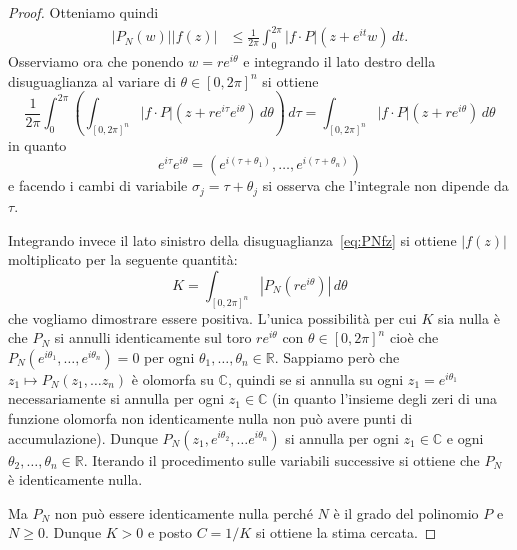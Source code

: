 \documentclass[italian,a4paper,oneside,headinclude]{scrbook}
\newcommand{\CC}{\mathbb C}
\newcommand{\RR}{\mathbb R}
\newcommand{\abs}[1]{{\left|#1\right|}}
\begin{document}
\begin{proof}
  Otteniamo quindi
  \begin{equation}\label{eq:PNfz}
  \begin{aligned}
    \abs{P_N(w)} \abs{f(z)}
    &\le \frac{1}{2\pi} \int_0^{2\pi} \abs{f\cdot P}(z+e^{i t}w)\, d t.
  \end{aligned}
  \end{equation}
  Osserviamo ora che ponendo $w=r e^{i\theta}$ e integrando il lato
  destro della disuguaglianza al variare di $\theta \in [0,2\pi]^n$ si
  ottiene
  \[
  \frac{1}{2\pi}\int_0^{2\pi} \left(\int_{[0,2\pi]^n} \abs{f\cdot
    P}(z+re^{i\tau}e^{i\theta})\, d\theta\right)\, d\tau
  = \int_{[0,2\pi]^n} \abs{f\cdot P}(z+re^{i\theta})\, d\theta
  \]
  in quanto
  \[
  e^{i\tau} e^{i\theta} = (e^{i(\tau+\theta_1)}, \dots, e^{i(\tau+\theta_n)})
  \]
  e facendo i cambi di variabile $\sigma_j = \tau + \theta_j$ si
  osserva che l'integrale non dipende da $\tau$.

  Integrando invece il lato sinistro della
  disuguaglianza~\eqref{eq:PNfz} si ottiene $\abs{f(z)}$ moltiplicato
  per la seguente quantità:
  \[
  K = \int_{[0,2\pi]^n} \abs{P_N(re^{i\theta})}\, d\theta
  \]
  che vogliamo dimostrare essere positiva. L'unica possibilità per cui
  $K$ sia nulla è che $P_N$ si annulli identicamente sul toro
  $r e^{i\theta}$ con $\theta \in [0,2\pi]^n$ cioè che
  $P_N(e^{i\theta_1}, \dots, e^{i\theta_n})=0$ per ogni
  $\theta_1, \dots, \theta_n \in \RR$.
  Sappiamo però che
  $z_1 \mapsto P_N(z_1, \dots z_n)$ è olomorfa su $\CC$,
  quindi se si annulla su
  ogni
  $z_1 = e^{i\theta_1}$ necessariamente si annulla per ogni
  $z_1\in\CC$ (in quanto l'insieme degli zeri di una funzione olomorfa
  non identicamente nulla non può avere punti di
  accumulazione). Dunque $P_N(z_1,e^{i\theta_2}, \dots e^{i\theta_n})$
  si annulla per ogni $z_1 \in \CC$ e ogni
  $\theta_2, \dots,
  \theta_n\in \RR$.
  Iterando il procedimento sulle variabili successive
  si ottiene che $P_N$ è identicamente nulla.

  Ma $P_N$ non può essere identicamente nulla perché $N$ è il grado
  del polinomio $P$ e $N\ge 0$. Dunque $K>0$ e posto $C=1/K$ si
  ottiene la stima cercata.
\end{proof}
\end{document}
